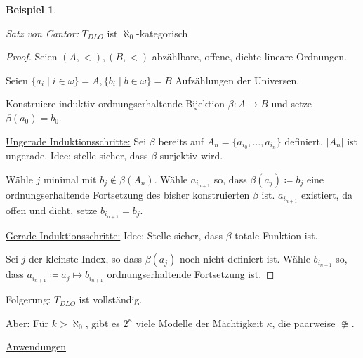 \documentclass[12pt,parskip=full]{scrartcl}
\newcommand{\abs}[1]{{\left| #1 \right|}}
\newcommand{\heading}{\underline}
\theoremstyle{definition}
\newtheorem{example}[theorem]{Beispiel}
\begin{document}
\begin{example}
\begin{enumerate}
			\textit{Satz von Cantor:} $T_{DLO}$ ist $\aleph_0$-kategorisch
			
			\begin{proof}
				Seien $(A, <), (B, <)$ abzählbare, offene, dichte lineare Ordnungen.
				
				Seien $\{ a_i \mid i \in \omega \} = A, \{ b_i \mid b \in \omega \} = B$ Aufzählungen der Universen.
				
				Konstruiere induktiv ordnungserhaltende Bijektion $\beta: A \to B$ und setze $\beta(a_0) = b_0$.
				
				\heading{Ungerade Induktionsschritte:} Sei $\beta$ bereits auf $A_n = \{ a_{i_0}, \dots, a_{i_n} \}$ definiert, $\abs{A_n}$ ist ungerade. Idee: stelle sicher, dass $\beta$ surjektiv wird.
				
				Wähle $j$ minimal mit $b_j \notin \beta(A_n)$. Wähle $a_{i_{n+1}}$ so, dass $\beta(a_j) \coloneqq b_j$ eine ordnungserhaltende Fortsetzung des bisher konstruierten $\beta$ ist. $a_{i_{n+1}}$ existiert, da offen und dicht, setze $b_{i_{n+1}} = b_j$.
				
				\heading{Gerade Induktionsschritte:} Idee: Stelle sicher, dass $\beta$ totale Funktion ist.
				
				Sei $j$ der kleinste Index, so dass $\beta(a_j)$ noch nicht definiert ist. Wähle $b_{i_{n+1}}$ so, dass $a_{i_{n+1}} \coloneqq a_j \mapsto b_{i_{n+1}}$ ordnungserhaltende Fortsetzung ist.
			\end{proof}
		
			Folgerung: $T_{DLO}$ ist vollständig.
			
			Aber: Für $k > \aleph_0$, gibt es $2^\kappa$ viele Modelle der Mächtigkeit $\kappa$, die paarweise $\ncong$.
		\end{enumerate}
	\end{example}

	\heading{Anwendungen}
	
\end{document}
